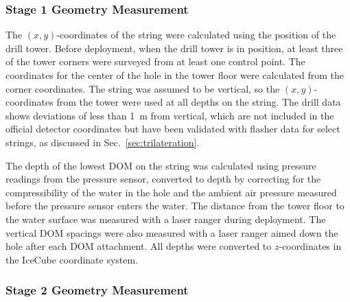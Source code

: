 \subsubsection{\label{subsec:stage1_geo}Stage 1 Geometry Measurement}
The $(x,y)$-coordinates of the string were calculated using the position of
the drill tower. Before deployment, when the drill tower is in position, at
least three of the tower corners were surveyed from at least one control
point.  The coordinates for the center of the hole in the tower floor were
calculated from the corner coordinates. The string was assumed to be
vertical, so the $(x,y)$-coordinates from the tower were used at all
depths on the string. The drill
data shows deviations of less than 1~m from vertical, which are not
included in the official detector coordinates but have been validated
with flasher data for select strings, as discussed in Sec.~\ref{sec:trilateration}. 

The depth of the lowest DOM on the string was calculated using pressure
readings from the pressure sensor, converted to depth by correcting for the
compressibility of the water in the hole and the ambient air pressure
measured before the pressure sensor enters the water. The distance from the
tower floor to the water surface was measured with a laser ranger
during deployment. The
vertical DOM spacings were also measured with a laser
ranger aimed down the hole after each DOM attachment. All depths were
converted to $z$-coordinates in the IceCube 
coordinate system.

\subsubsection{\label{subsec:stage2_geo}Stage 2 Geometry Measurement}

